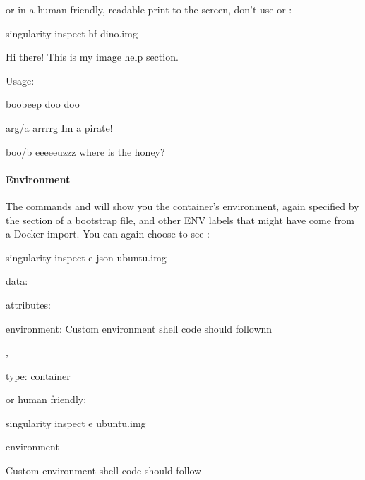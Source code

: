 \documentclass[letterpaper,10pt,english]{sphinxmanual}
\begin{document}
or in a human friendly, readable print to the screen, don’t use  or :

%
\begin{sphinxVerbatim}[commandchars=\\\{\}]
\PYGZdl{} singularity inspect \PYGZhy{}hf dino.img



Hi there! This is my image help section.


Usage:


boobeep doo doo


 \PYGZhy{}\PYGZhy{}arg/a arrrrg I\PYGZsq{}m a pirate!

 \PYGZhy{}\PYGZhy{}boo/b eeeeeuzzz where is the honey?
\end{sphinxVerbatim}


\paragraph{Environment}
\label{\detokenize{appendix:environment}}
The commands  and  will show you the container’s environment, again
specified by the  section of a bootstrap file, and other ENV labels that
might have come from a Docker import. You can again choose to see  :

%
\begin{sphinxVerbatim}[commandchars=\\\{\}]
\PYGZdl{} singularity inspect \PYGZhy{}e \PYGZhy{}\PYGZhy{}json ubuntu.img

\PYGZob{}

    \PYGZdq{}data\PYGZdq{}: \PYGZob{}

        \PYGZdq{}attributes\PYGZdq{}: \PYGZob{}

            \PYGZdq{}environment\PYGZdq{}: \PYGZdq{}\PYGZsh{} Custom environment shell code should follow\PYGZbs{}n\PYGZbs{}n\PYGZdq{}

        \PYGZcb{},

        \PYGZdq{}type\PYGZdq{}: \PYGZdq{}container\PYGZdq{}

    \PYGZcb{}

\PYGZcb{}
\end{sphinxVerbatim}

or human friendly:

%
\begin{sphinxVerbatim}[commandchars=\\\{\}]
\PYGZdl{} singularity inspect \PYGZhy{}e ubuntu.img


\PYGZsh{}\PYGZsh{}environment

\PYGZsh{} Custom environment shell code should follow
\end{sphinxVerbatim}
\end{document}
